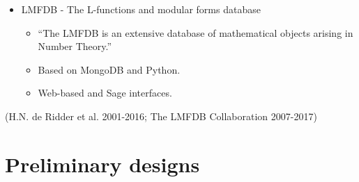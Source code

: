 \documentclass[pdf,sprung,slideColor,nocolorBG]{beamer}
\newenvironment{colortheme}[1]{
\def\ProvidesPackageRCS $##1${\relax}
\renewcommand{\ProcessOptions}{\relax}
\makeatletter

\makeatother
}{}
\newcommand{\slidecite}[1]{\tiny{(#1)}\normalsize{}}
\begin{document}
\begin{colortheme}{seagull}
\begin{frame}
\begin{itemize}
~

 \item
LMFDB - The L-functions and modular forms database
 \begin{itemize}
  \item
``The LMFDB is an extensive database of mathematical objects arising in Number Theory.''
  \item
Based on MongoDB and Python.
  \item
Web-based and Sage interfaces.
 \end{itemize}
\end{itemize}
\slidecite{H.N. de Ridder et al. 2001-2016; The LMFDB Collaboration 2007-2017}
\end{frame}

\end{colortheme}

\section{Preliminary designs}
\end{document}
